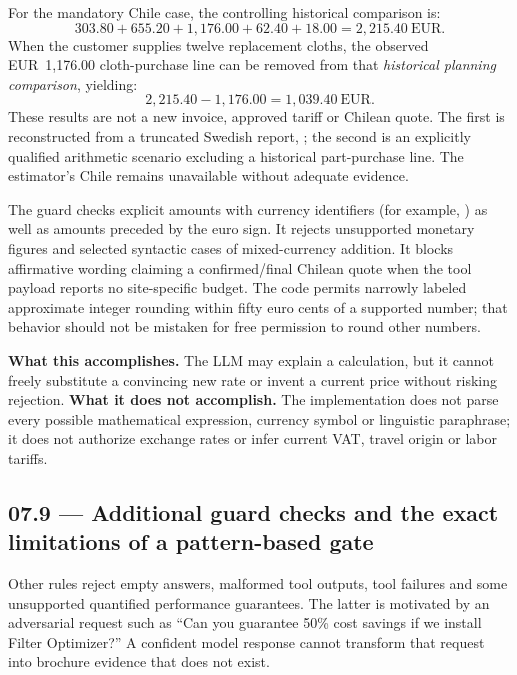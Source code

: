 \documentclass[11pt,a4paper]{article}
\DeclareRobustCommand{\code}[1]{{\ttfamily\small\detokenize{#1}}}
\begin{document}
For the mandatory Chile case, the controlling historical comparison is:
\[
 303.80 + 655.20 + 1{,}176.00 + 62.40 + 18.00
 = \boxed{2{,}215.40\ \mathrm{EUR}}.
\]
When the customer supplies twelve replacement cloths, the observed EUR~1,176.00 cloth-purchase line can be removed from that \emph{historical planning comparison}, yielding:
\[
 2{,}215.40 - 1{,}176.00 = \boxed{1{,}039.40\ \mathrm{EUR}}.
\]
These results are not a new invoice, approved tariff or Chilean quote. The first is reconstructed from a truncated Swedish report, \code{FSR-0027}; the second is an explicitly qualified arithmetic scenario excluding a historical part-purchase line. The estimator's Chile \code{site_specific_budget} remains unavailable without adequate evidence.

The guard checks explicit amounts with currency identifiers (for example, \code{2215.40 EUR}) as well as amounts preceded by the euro sign. It rejects unsupported monetary figures and selected syntactic cases of mixed-currency addition. It blocks affirmative wording claiming a confirmed/final Chilean quote when the tool payload reports no site-specific budget. The code permits narrowly labeled approximate integer rounding within fifty euro cents of a supported number; that behavior should not be mistaken for free permission to round other numbers.

\textbf{What this accomplishes.} The LLM may explain a calculation, but it cannot freely substitute a convincing new rate or invent a current price without risking rejection. \textbf{What it does not accomplish.} The implementation does not parse every possible mathematical expression, currency symbol or linguistic paraphrase; it does not authorize exchange rates or infer current VAT, travel origin or labor tariffs.

\subsection{07.9 --- Additional guard checks and the exact limitations of a pattern-based gate}
Other rules reject empty answers, malformed tool outputs, tool failures and some unsupported quantified performance guarantees. The latter is motivated by an adversarial request such as ``Can you guarantee 50\% cost savings if we install Filter Optimizer?'' A confident model response cannot transform that request into brochure evidence that does not exist.
\end{document}

